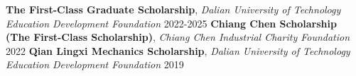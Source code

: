 
\begin{cvedu}


  \cvhonor
    { {\bf The First-Class Graduate Scholarship}, \newline \textit{Dalian University of Technology Education Development Foundation} \hspace{2em} \hfill } %
    {2022-2025} %
  \cvhonor
    { {\bf Chiang Chen Scholarship  (The First-Class Scholarship)}, \newline \textit{Chiang Chen Industrial Charity Foundation} \hspace{2em} \hfill } %
    {2022} %
  \cvhonor
    { {\bf Qian Lingxi Mechanics Scholarship}, \newline \textit{Dalian University of Technology Education Development Foundation} \hspace{2em} \hfill } %
    {2019} %




\end{cvedu}
